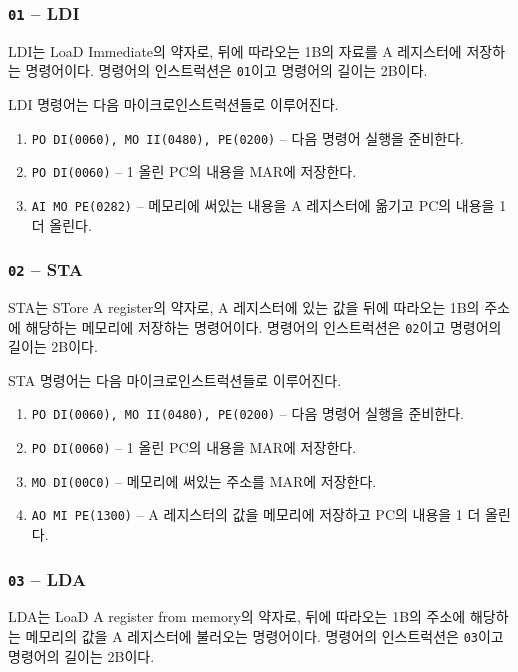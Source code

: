 \documentclass{article}
\begin{document}
\subsubsection{\texttt{01} -- LDI}

LDI는 LoaD Immediate의 약자로, 뒤에 따라오는 1B의 자료를
A 레지스터에 저장하는 명령어이다.
명령어의 인스트럭션은 \texttt{01}이고 명령어의 길이는 2B이다.

LDI 명령어는 다음 마이크로인스트럭션들로 이루어진다.

\begin{enumerate}
    \item \texttt{PO DI(0060), MO II(0480), PE(0200)} -- 다음 명령어 실행을 준비한다.
    \item \texttt{PO DI(0060)} -- 1 올린 PC의 내용을 MAR에 저장한다.
    \item \texttt{AI MO PE(0282)} -- 메모리에 써있는 내용을 A 레지스터에 옮기고
        PC의 내용을 1 더 올린다.
\end{enumerate}

\subsubsection{\texttt{02} -- STA}

STA는 STore A register의 약자로, A 레지스터에 있는 값을
뒤에 따라오는 1B의 주소에 해당하는 메모리에 저장하는 명령어이다.
명령어의 인스트럭션은 \texttt{02}이고 명령어의 길이는 2B이다.

STA 명령어는 다음 마이크로인스트럭션들로 이루어진다.

\begin{enumerate}
    \item \texttt{PO DI(0060), MO II(0480), PE(0200)} -- 다음 명령어 실행을 준비한다.
    \item \texttt{PO DI(0060)} -- 1 올린 PC의 내용을 MAR에 저장한다.
    \item \texttt{MO DI(00C0)} -- 메모리에 써있는 주소를 MAR에 저장한다.
    \item \texttt{AO MI PE(1300)} -- A 레지스터의 값을 메모리에 저장하고
        PC의 내용을 1 더 올린다.
\end{enumerate}

\subsubsection{\texttt{03} -- LDA}

LDA는 LoaD A register from memory의 약자로, 뒤에 따라오는 1B의 주소에 해당하는
메모리의 값을 A 레지스터에 불러오는 명령어이다.
명령어의 인스트럭션은 \texttt{03}이고 명령어의 길이는 2B이다.
\end{document}
